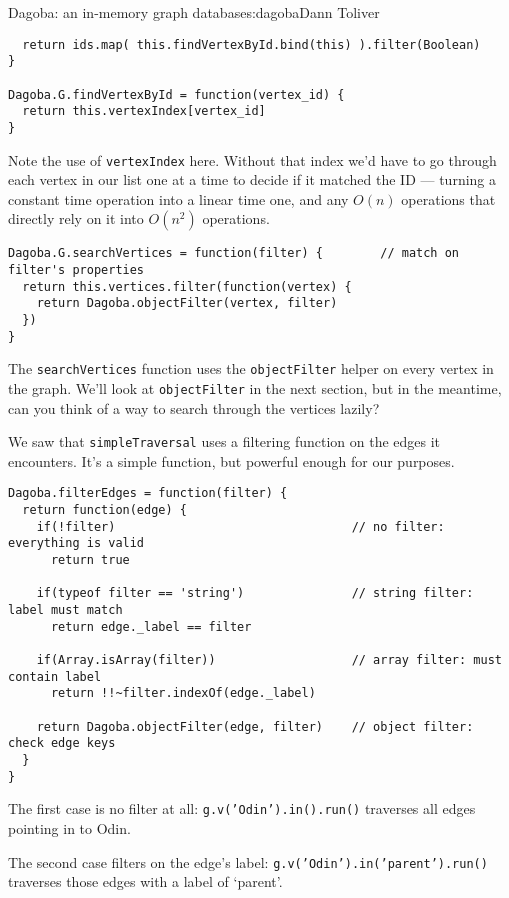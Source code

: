 \begin{aosachapter}{Dagoba: an in-memory graph database}{s:dagoba}{Dann Toliver}
\begin{verbatim}
  return ids.map( this.findVertexById.bind(this) ).filter(Boolean)
}

Dagoba.G.findVertexById = function(vertex_id) {
  return this.vertexIndex[vertex_id]
}
\end{verbatim}

Note the use of \texttt{vertexIndex} here. Without that index we'd have
to go through each vertex in our list one at a time to decide if it
matched the ID --- turning a constant time operation into a linear time
one, and any $O(n)$ operations that directly rely on it into $O(n^2)$
operations.

\begin{verbatim}
Dagoba.G.searchVertices = function(filter) {        // match on filter's properties
  return this.vertices.filter(function(vertex) {
    return Dagoba.objectFilter(vertex, filter)
  })
}
\end{verbatim}

The \texttt{searchVertices} function uses the \texttt{objectFilter}
helper on every vertex in the graph. We'll look at \texttt{objectFilter}
in the next section, but in the meantime, can you think of a way to
search through the vertices lazily?

\label{filtering}

We saw that \texttt{simpleTraversal} uses a filtering function on the
edges it encounters. It's a simple function, but powerful enough for our
purposes.

\begin{verbatim}
Dagoba.filterEdges = function(filter) {
  return function(edge) {
    if(!filter)                                 // no filter: everything is valid
      return true

    if(typeof filter == 'string')               // string filter: label must match
      return edge._label == filter

    if(Array.isArray(filter))                   // array filter: must contain label
      return !!~filter.indexOf(edge._label)

    return Dagoba.objectFilter(edge, filter)    // object filter: check edge keys
  }
}
\end{verbatim}

The first case is no filter at all: \texttt{g.v('Odin').in().run()}
traverses all edges pointing in to Odin.

The second case filters on the edge's label:
\texttt{g.v('Odin').in('parent').run()} traverses those edges with a
label of `parent'.


\end{aosachapter}
